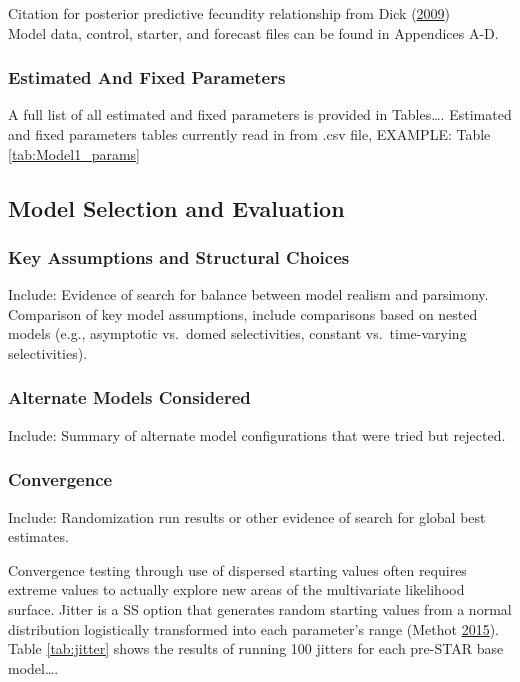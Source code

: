 \documentclass[12pt,]{article}
\begin{document}
Citation for posterior predictive fecundity relationship from Dick
(\protect\hyperlink{ref-Dick2009}{2009})\\
Model data, control, starter, and forecast files can be found in
Appendices A-D.

\subsubsection{Estimated And Fixed
Parameters}\label{estimated-and-fixed-parameters}

A full list of all estimated and fixed parameters is provided in
Tables\ldots{}. Estimated and fixed parameters tables currently read in
from .csv file, EXAMPLE: Table \ref{tab:Model1_params}

\subsection{Model Selection and
Evaluation}\label{model-selection-and-evaluation}

\subsubsection{Key Assumptions and Structural
Choices}\label{key-assumptions-and-structural-choices}

Include: Evidence of search for balance between model realism and
parsimony.\\
Comparison of key model assumptions, include comparisons based on nested
models (e.g., asymptotic vs.~domed selectivities, constant
vs.~time-varying selectivities).

\subsubsection{Alternate Models
Considered}\label{alternate-models-considered}

Include: Summary of alternate model configurations that were tried but
rejected.

\subsubsection{Convergence}\label{convergence}

Include: Randomization run results or other evidence of search for
global best estimates.

Convergence testing through use of dispersed starting values often
requires extreme values to actually explore new areas of the
multivariate likelihood surface. Jitter is a SS option that generates
random starting values from a normal distribution logistically
transformed into each parameter's range (Methot
\protect\hyperlink{ref-Methot2015}{2015}). Table \ref{tab:jitter} shows
the results of running 100 jitters for each pre-STAR base model\ldots{}.
\end{document}
